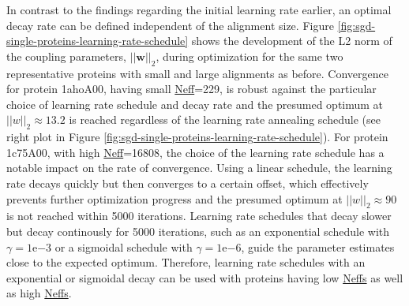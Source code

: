 \documentclass[11pt,a4paper,twoside]{book}
\newcommand{\eq}{\!=\!}
\newcommand{\w}{\mathbf{w}}
\theoremstyle{definition}
\theoremstyle{definition}
\theoremstyle{remark}
\begin{document}
In contrast to the findings regarding the initial learning rate earlier,
an optimal decay rate can be defined independent of the alignment size.
Figure \ref{fig:sgd-single-proteins-learning-rate-schedule} shows the
development of the L2 norm of the coupling parameters, \(||\w||_2\),
during optimization for the same two representative proteins with small
and large alignments as before. Convergence for protein 1ahoA00, having
small \protect\hyperlink{abbrev}{Neff}=229, is robust against the
particular choice of learning rate schedule and decay rate and the
presumed optimum at \(||w||_2 \approx 13.2\) is reached regardless of
the learning rate annealing schedule (see right plot in Figure
\ref{fig:sgd-single-proteins-learning-rate-schedule}). For protein
1c75A00, with high \protect\hyperlink{abbrev}{Neff}=16808, the choice of
the learning rate schedule has a notable impact on the rate of
convergence. Using a linear schedule, the learning rate decays quickly
but then converges to a certain offset, which effectively prevents
further optimization progress and the presumed optimum at
\(||w||_2 \approx 90\) is not reached within 5000 iterations. Learning
rate schedules that decay slower but decay continously for 5000
iterations, such as an exponential schedule with
\(\gamma \eq 1\mathrm{e}{-3}\) or a sigmoidal schedule with
\(\gamma \eq 1\mathrm{e}{-6}\), guide the parameter estimates close to
the expected optimum. Therefore, learning rate schedules with an
exponential or sigmoidal decay can be used with proteins having low
\protect\hyperlink{abbrev}{Neffs} as well as high
\protect\hyperlink{abbrev}{Neffs}.
\end{document}
